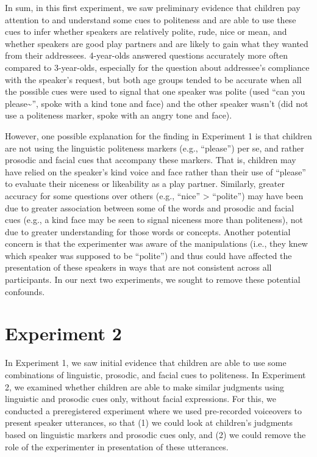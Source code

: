 \documentclass[10pt, letterpaper]{article}
\begin{document}
In sum, in this first experiment, we saw preliminary evidence that
children pay attention to and understand some cues to politeness and are
able to use these cues to infer whether speakers are relatively polite,
rude, nice or mean, and whether speakers are good play partners and are
likely to gain what they wanted from their addressees. 4-year-olds
answered questions accurately more often compared to 3-year-olds,
especially for the question about addressee's compliance with the
speaker's request, but both age groups tended to be accurate when all
the possible cues were used to signal that one speaker was polite (used
``can you please\textasciitilde{}'', spoke with a kind tone and face)
and the other speaker wasn't (did not use a politeness marker, spoke
with an angry tone and face).

However, one possible explanation for the finding in Experiment 1 is
that children are not using the linguistic politeness markers (e.g.,
``please'') per se, and rather prosodic and facial cues that accompany
these markers. That is, children may have relied on the speaker's kind
voice and face rather than their use of ``please'' to evaluate their
niceness or likeability as a play partner. Similarly, greater accuracy
for some questions over others (e.g., ``nice'' \textgreater{}
``polite'') may have been due to greater association between some of the
words and prosodic and facial cues (e.g., a kind face may be seen to
signal niceness more than politeness), not due to greater understanding
for those words or concepts. Another potential concern is that the
experimenter was aware of the manipulations (i.e., they knew which
speaker was supposed to be ``polite'') and thus could have affected the
presentation of these speakers in ways that are not consistent across
all participants. In our next two experiments, we sought to remove these
potential confounds.

\section{Experiment 2}\label{experiment-2}

In Experiment 1, we saw initial evidence that children are able to use
some combinations of linguistic, prosodic, and facial cues to
politeness. In Experiment 2, we examined whether children are able to
make similar judgments using linguistic and prosodic cues only, without
facial expressions. For this, we conducted a preregistered experiment
where we used pre-recorded voiceovers to present speaker utterances, so
that (1) we could look at children's judgments based on linguistic
markers and prosodic cues only, and (2) we could remove the role of the
experimenter in presentation of these utterances.
\end{document}
